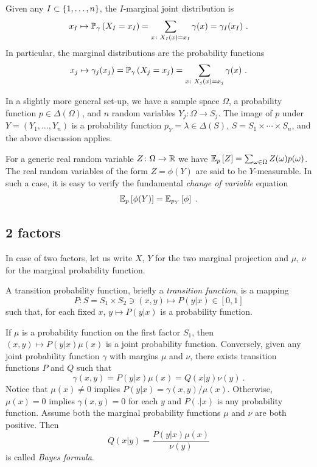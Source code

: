 \documentclass[12pt,a4paper]{amsart}
\theoremstyle{plain}%
\theoremstyle{definition}
\theoremstyle{remark}
\begin{document}
Given any $I \subset \left\{1,\dots,n\right\}$, the $I$-marginal joint distribution is
\begin{equation*}
  x_I \mapsto \operatorname{\mathbb P}_{\gamma}\left(X_I = x_I\right) = \sum_{x \colon X_I(x)=x_I} \gamma(x) = \gamma_I(x_I) \ .
\end{equation*}
In particular, the marginal distributions are the probability functions
\begin{equation*}
 x_j \mapsto \gamma_j(x_j) = \operatorname{\mathbb P}_{\gamma}\left(X_j = x_j\right) = \sum_{x \colon X_j(x) = x_j} \gamma(x) \ .
\end{equation*}

In a slightly more general set-up, we have a sample space $\Omega$, a
probability function $p \in \Delta(\Omega)$, and $n$ random variables
$Y_j \colon \Omega \to S_j$. The image of $p$ under $Y =
(Y_1,\dots,Y_n)$ is a probability function $p_Y = \lambda \in
\Delta(S)$, $S=S_1 \times \cdots \times S_n$, and the above discussion
applies.

For a generic real random variable $Z \colon \Omega \to \mathbb{R}$ we have
$\operatorname{\mathbb E}_{p}\left[Z\right] = \sum_{\omega\in\Omega} Z(\omega)p(\omega)$. The real
random variables of the form $Z = \phi(Y)$ are said to be
$Y$-measurable. In such a case, it is easy to verify the fundamental
\emph{change of variable} equation
\begin{equation*}
  \operatorname{\mathbb E}_{p}\left[\phi(Y)\right] = \operatorname{\mathbb E}_{p_Y}\left[\phi\right] \ .
\end{equation*}

\subsection{2 factors}

In case of two factors, let us write $X$, $Y$ for the two marginal
projection and $\mu$, $\nu$ for the marginal probability function.

A transition probability function, briefly a \emph{transition function}, is a mapping
\begin{equation*}
  P \colon S = S_1 \times S_2 \ni (x,y) \mapsto P(y|x) \in [0,1]
\end{equation*}
such that, for each fixed $x$, $y \mapsto P(y|x)$ is a probability function.

If $\mu$ is a probability function on the first factor $S_1$, then $(x,y) \mapsto P(y|x)\mu(x)$  is a joint probability function. Conversely, given any joint probability function $\gamma$ with margins $\mu$ and $\nu$, there exists transition functions $P$ and $Q$ such that
\begin{equation*}
  \gamma(x,y) = P(y|x)\mu(x) = Q(x|y)\nu(y) \ .
\end{equation*}
Notice that $\mu(x) \neq 0$ implies $P(y|x) = \gamma(x,y)/\mu(x)$. Otherwise, $\mu(x)=0$ implies $\gamma(x,y) = 0$ for each $y$ and $P(.|x)$ is any probability function. Assume both the marginal probability functions $\mu$ and $\nu$ are both positive. Then
\begin{equation*}
  Q(x|y) = \frac {P(y|x)\mu(x)}{\nu(y)}
\end{equation*}
is called \emph{Bayes formula}.
\end{document}
